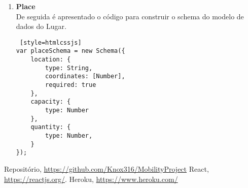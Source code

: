 \documentclass[11pt]{report}
\begin{document}
\begin{enumerate}
\begin{lstlisting} [style=htmlcssjs]
\end{lstlisting}
\clearpage
\item \textbf{Place}\\
De seguida é apresentado o código para construir o schema do modelo de dados do Lugar.
\bigskip

\begin{lstlisting} [style=htmlcssjs]
var placeSchema = new Schema({
    location: {
        type: String,
        coordinates: [Number],
        required: true
    },
    capacity: {
        type: Number
    },
    quantity: {
        type: Number,
    }
});

\end{lstlisting}
\end{enumerate}
	


\clearpage





\clearpage

\begin{thebibliography}{5}
		 Repositório, \url{https://github.com/Knox316/MobilityProject}
		React, \url{https://reactjs.org/}.
		 Heroku, \url{https://www.heroku.com/}
	





	
\end{thebibliography}

\clearpage
\end{document}
